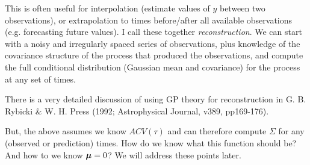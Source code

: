 \documentclass[a4paper, 11pt, amsmath, graphicx]{article}\usepackage[]{graphicx}\usepackage[]{color}
\def\bmu{{\mbox{\boldmath $\mu$}}}
\begin{document}
This is often useful for interpolation (estimate values of $y$ between two observations), or extrapolation to times before/after all available observations (e.g. forecasting future values). I call these together \emph{reconstruction}. We can start with a noisy and irregularly spaced series of observations, plus knowledge of the covariance structure of the process that produced the observations, and compute the full conditional distribution (Gaussian mean and covariance) for the process at any set of times.

There is a very detailed discussion of using GP theory for reconstruction in G. B. Rybicki \& W. H. Press (1992; Astrophysical Journal, v389, pp169-176). 

But, the above assumes we know $ACV(\tau)$ and can therefore compute $\Sigma$ for any (observed or prediction) times. How do we know what this function should be? And how to we know $\bmu =0$? We will address these points later.
\end{document}
